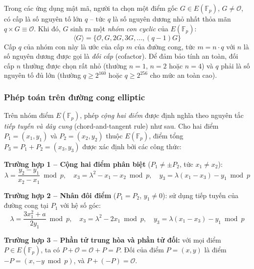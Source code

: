 Trong các ứng dụng mật mã, người ta chọn một điểm gốc $G \in E(\mathbb{F}_p)$, $G \neq \mathcal{O}$, có cấp là số nguyên tố lớn $q$ -- tức $q$ là số nguyên dương nhỏ nhất thỏa mãn $q \times G \equiv \mathcal{O}$. Khi đó, $G$ sinh ra một \textit{nhóm con cyclic} của $E(\mathbb{F}_p)$:
\begin{equation}
\langle G \rangle = \{\mathcal{O}, G, 2G, 3G, \ldots, (q-1)G\}
\label{eq:cyclic-subgroup}
\end{equation}
Cấp $q$ của nhóm con này là ước của cấp $m$ của đường cong, tức $m = n \cdot q$ với $n$ là số nguyên dương được gọi là \textit{đối cấp} (cofactor). Để đảm bảo tính an toàn, đối cấp $n$ thường được chọn rất nhỏ (thường $n = 1$, $n = 2$ hoặc $n = 4$) và $q$ phải là số nguyên tố đủ lớn (thường $q \geq 2^{160}$ hoặc $q \geq 2^{256}$ cho mức an toàn cao).

\subsubsection{Phép toán trên đường cong elliptic}

Trên nhóm điểm $E(\mathbb{F}_p)$, phép \textit{cộng hai điểm} được định nghĩa theo nguyên tắc \textit{tiếp tuyến và dây cung} (chord-and-tangent rule) như sau. Cho hai điểm $P_1 = (x_1, y_1)$ và $P_2 = (x_2, y_2)$ thuộc $E(\mathbb{F}_p)$, điểm tổng $P_3 = P_1 + P_2 = (x_3, y_3)$ được xác định bởi các công thức:

\textbf{Trường hợp 1 -- Cộng hai điểm phân biệt} ($P_1 \neq \pm P_2$, tức $x_1 \neq x_2$):
\begin{equation}
\lambda = \frac{y_2 - y_1}{x_2 - x_1} \bmod p, \quad x_3 = \lambda^2 - x_1 - x_2 \bmod p, \quad y_3 = \lambda(x_1 - x_3) - y_1 \bmod p
\label{eq:point-add}
\end{equation}

\textbf{Trường hợp 2 -- Nhân đôi điểm} ($P_1 = P_2$, $y_1 \neq 0$): sử dụng tiếp tuyến của đường cong tại $P_1$ với hệ số góc:
\begin{equation}
\lambda = \frac{3x_1^2 + a}{2y_1} \bmod p, \quad x_3 = \lambda^2 - 2x_1 \bmod p, \quad y_3 = \lambda(x_1 - x_3) - y_1 \bmod p
\label{eq:point-double}
\end{equation}

\textbf{Trường hợp 3 -- Phần tử trung hòa và phần tử đối:} với mọi điểm $P \in E(\mathbb{F}_p)$, ta có $P + \mathcal{O} = \mathcal{O} + P = P$. Đối của điểm $P = (x, y)$ là điểm $-P = (x, -y \bmod p)$, và $P + (-P) = \mathcal{O}$.

